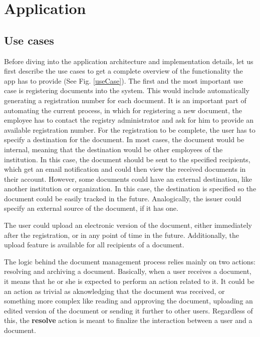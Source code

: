 \chapter{Application}
\label{chapter:application}


\section{Use cases}
\label{section:useCases}

Before diving into the application architecture and implementation details, let us first describe the use cases to get a complete overview of the functionality the app has to provide (See Fig. \ref{useCase}). The first and the most important use case is registering documents into the system. This would include automatically generating a registration number for each document. It is an important part of automating the current process, in which for registering a new document, the employee has to contact the registry administrator and ask for him to provide an available registration number. For the registration to be complete, the user has to specify a destination for the document. In most cases, the document would be internal, meaning that the destination would be other employees of the institution. In this case, the document should be sent to the specified recipients, which get an email notification and could then view the received documents in their account. However, some documents could have an external destination, like another institution or organization. In this case, the destination is specified so the document could be easily tracked in the future. Analogically, the issuer could specify an external source of the document, if it has one.

The user could upload an electronic version of the document, either immediately after the registration, or in any point of time in the future. Additionally, the upload feature is available for all recipients of a document.

The logic behind the document management process relies mainly on two actions: resolving and archiving a document. Basically, when a user receives a document, it means that he or she is expected to perform an action related to it. It could be an action as trivial as aknowledging that the document was received, or something more complex like reading and approving the document, uploading an edited version of the document or sending it further to other users. Regardless of this, the \textbf{resolve} action is meant to finalize the interaction between a user and a document.

